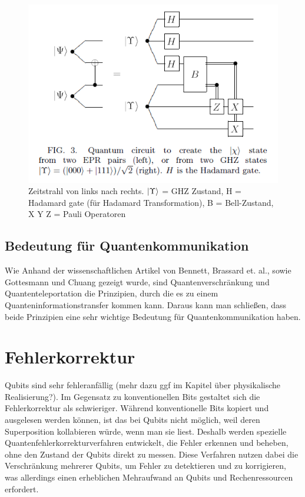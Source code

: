 \begin{figure}[h!]
    \centering
    \includegraphics[width=1.0\textwidth]{images/quantum-information/quantenteleportation_cnot_3.png}
    \caption{Zeitstrahl von links nach rechts. \(\ket{\Upsilon}\) = GHZ Zustand, H = Hadamard gate (für Hadamard Transformation), B = Bell-Zustand, X Y Z = Pauli Operatoren}
    \label{fig:meinbild}
\end{figure}
\newpage

\subsection{Bedeutung für Quantenkommunikation}
Wie Anhand der wissenschaftlichen Artikel von Bennett, Brassard et. al., sowie Gottesmann und Chuang gezeigt wurde, sind Quantenverschränkung und Quantenteleportation die Prinzipien, durch die es zu einem Quanteninformationstransfer kommen kann. Daraus kann man schließen, dass beide Prinzipien eine sehr wichtige Bedeutung für Quantenkommunikation haben.

\section{Fehlerkorrektur}
Qubits sind sehr fehleranfällig (mehr dazu ggf im Kapitel über physikalische Realisierung?). Im Gegensatz zu konventionellen Bits gestaltet sich die Fehlerkorrektur als schwieriger. Während konventionelle Bits kopiert und ausgelesen werden können, ist das bei Qubits nicht möglich, weil deren Superposition kollabieren würde, wenn man sie liest. Deshalb werden spezielle Quantenfehlerkorrekturverfahren entwickelt, die Fehler erkennen und beheben, ohne den Zustand der Qubits direkt zu messen. Diese Verfahren nutzen dabei die Verschränkung mehrerer Qubits, um Fehler zu detektieren und zu korrigieren, was allerdings einen erheblichen Mehraufwand an Qubits und Rechenressourcen erfordert.

